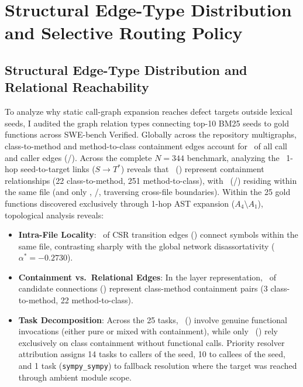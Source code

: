 \documentclass[10pt]{article}
\begin{document}
\section{Structural Edge-Type Distribution and Selective Routing Policy}
\label{app:causal_provenance_full}

\subsection{Structural Edge-Type Distribution and Relational Reachability}
To analyze why static call-graph expansion reaches defect targets outside lexical seeds, I audited the graph relation types connecting top-10 BM25 seeds to gold functions across SWE-bench Verified.
Globally across the repository multigraphs, class-to-method and method-to-class containment edges account for \HonestContainmentGlobalFraction\ of all call and caller edges (\HonestContainmentCtoMCalls/\HonestContainmentTotalCalls). Across the complete $N=344$ benchmark, analyzing the \HonestContainmentOneHopTotal\ 1-hop seed-to-target links ($S \to T^*$) reveals that \HonestContainmentOneHopPct\ (\HonestContainmentOneHopFrac) represent containment relationships (22 class-to-method, 251 method-to-class), with \HonestContainmentOneHopIntraFilePct\ (\HonestContainmentOneHopIntraFile/\HonestContainmentOneHopTotal) residing within the same file (and only \HonestContainmentOneHopCrossFilePct, \HonestContainmentOneHopCrossFile/\HonestContainmentOneHopTotal, traversing cross-file boundaries).
Within the 25 gold functions discovered exclusively through 1-hop AST expansion ($A_4 \setminus A_1$), topological analysis reveals:
\begin{itemize}[noitemsep,topsep=2pt,parsep=0pt,partopsep=0pt]
    \item \textbf{Intra-File Locality}: \HonestContainmentAFourMinusAOneCsrIntraPct\ of CSR transition edges (\HonestContainmentAFourMinusAOneCsrIntraFrac) connect symbols within the same file, contrasting sharply with the global network disassortativity ($\alpha^* = -0.2730$).
    \item \textbf{Containment vs.\ Relational Edges}: In the layer representation, \HonestContainmentAFourMinusAOneLayerPct\ of candidate connections (\HonestContainmentAFourMinusAOneLayerFrac) represent class-method containment pairs (3 class-to-method, 22 method-to-class).
    \item \textbf{Task Decomposition}: Across the 25 tasks, \HonestContainmentAFourMinusAOneGenuinePct\ (\HonestContainmentAFourMinusAOneGenuineFrac) involve genuine functional invocations (either pure or mixed with containment), while only \HonestContainmentAFourMinusAOneSolePct\ (\HonestContainmentAFourMinusAOneSoleFrac) rely exclusively on class containment without functional calls. Priority resolver attribution assigns 14 tasks to callers of the seed, 10 to callees of the seed, and 1 task (\texttt{sympy\_\allowbreak sympy}) to fallback resolution where the target was reached through ambient module scope.
\end{itemize}
\end{document}
